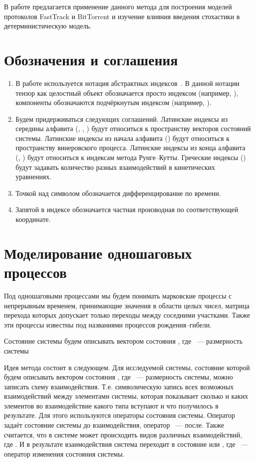 \documentclass[floatfix,
showkeys,
twocolumn, nofootinbib, superscriptaddress, ]{revtex4-1}
\begin{document}
  В работе предлагается применение данного метода для построения
  моделей протоколов FastTrack и BitTorrent и изучение влияния
  введения стохастики в детерминистическую модель.


\section{Обозначения и соглашения}
\label{sec:2}

  \begin{enumerate}
  \item В работе используется нотация абстрактных
    индексов~\cite{penrose-rindler-1987}. В данной нотации тензор как
    целостный объект обозначается просто индексом (например, ),
    компоненты обозначаются подчёркнутым индексом (например,
    ).

  \item Будем придерживаться следующих соглашений. Латинские индексы
    из середины алфавита (, , ) будут относиться к
    пространству векторов состояний системы. Латинские индексы из
    начала алфавита () будут относиться к пространству винеровского
    процесса. Латинские индексы из конца алфавита (, ) будут
    относиться к индексам метода Рунге--Кутты. Греческие индексы
    () будут задавать количество разных взаимодействий в
    кинетических уравнениях.

  \item Точкой над символом обозначается дифференцирование по времени.

  \item Запятой в индексе обозначается частная производная по
    соответствующей координате.

  \end{enumerate}

\section{Моделирование одношаговых процессов}
\label{sec:onestep}

  Под одношаговыми процессами мы будем понимать марковские процессы с
  непрерывным временем, принимающие значения в области целых чисел,
  матрица перехода которых допускает только переходы между соседними
  участками. Также эти процессы известны под названиями процессов
  рождения--гибели.

  Состояние системы будем описывать вектором состояния , где ~--- размерность системы

  Идея метода состоит в следующем. Для исследуемой системы, состояние
  которой будем описывать вектором состояния , где
  ~--- размерность системы, можно записать схему
  взаимодействия. Т.е. символическую запись всех возможных
  взаимодействий между элементами системы, которая показывает сколько
  и каких элементов во взаимодействие какого типа вступают и что
  получилось в результате. Для этого используются операторы состояния
  системы. Оператор  задаёт
  состояние системы до взаимодействия, оператор ~--- после. Также считается, что в системе может
  происходить  видов различных взаимодействий, где . И в результате взаимодействия система переходит в
  состояние  или
  , где
  ~---оператор
  изменения состояния системы.
\end{document}
